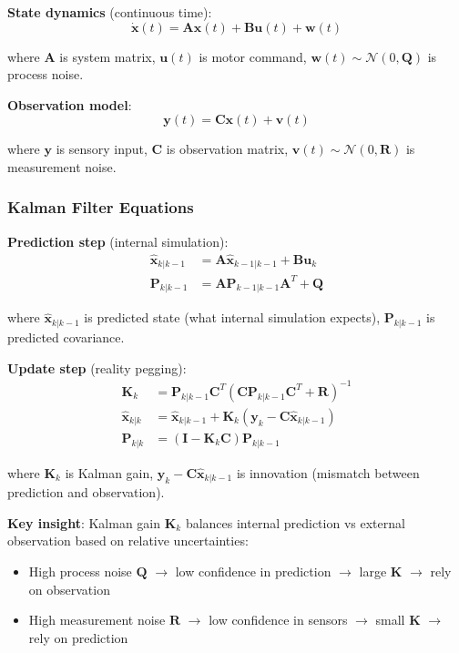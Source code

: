 \documentclass[11pt,onecolumn]{article}
\begin{document}
\textbf{State dynamics} (continuous time):
\begin{equation}
\dot{\mathbf{x}}(t) = \mathbf{A}\mathbf{x}(t) + \mathbf{B}\mathbf{u}(t) + \mathbf{w}(t)
\end{equation}

where $\mathbf{A}$ is system matrix, $\mathbf{u}(t)$ is motor command, $\mathbf{w}(t) \sim \mathcal{N}(0, \mathbf{Q})$ is process noise.

\textbf{Observation model}:
\begin{equation}
\mathbf{y}(t) = \mathbf{C}\mathbf{x}(t) + \mathbf{v}(t)
\end{equation}

where $\mathbf{y}$ is sensory input, $\mathbf{C}$ is observation matrix, $\mathbf{v}(t) \sim \mathcal{N}(0, \mathbf{R})$ is measurement noise.

\subsubsection{Kalman Filter Equations}

\textbf{Prediction step} (internal simulation):
\begin{align}
\hat{\mathbf{x}}_{k|k-1} &= \mathbf{A}\hat{\mathbf{x}}_{k-1|k-1} + \mathbf{B}\mathbf{u}_k \\
\mathbf{P}_{k|k-1} &= \mathbf{A}\mathbf{P}_{k-1|k-1}\mathbf{A}^T + \mathbf{Q}
\end{align}

where $\hat{\mathbf{x}}_{k|k-1}$ is predicted state (what internal simulation expects), $\mathbf{P}_{k|k-1}$ is predicted covariance.

\textbf{Update step} (reality pegging):
\begin{align}
\mathbf{K}_k &= \mathbf{P}_{k|k-1}\mathbf{C}^T(\mathbf{C}\mathbf{P}_{k|k-1}\mathbf{C}^T + \mathbf{R})^{-1} \\
\hat{\mathbf{x}}_{k|k} &= \hat{\mathbf{x}}_{k|k-1} + \mathbf{K}_k(\mathbf{y}_k - \mathbf{C}\hat{\mathbf{x}}_{k|k-1}) \\
\mathbf{P}_{k|k} &= (\mathbf{I} - \mathbf{K}_k\mathbf{C})\mathbf{P}_{k|k-1}
\end{align}

where $\mathbf{K}_k$ is Kalman gain, $\mathbf{y}_k - \mathbf{C}\hat{\mathbf{x}}_{k|k-1}$ is innovation (mismatch between prediction and observation).

\textbf{Key insight}: Kalman gain $\mathbf{K}_k$ balances internal prediction vs external observation based on relative uncertainties:
\begin{itemize}
\item High process noise $\mathbf{Q}$ $\to$ low confidence in prediction $\to$ large $\mathbf{K}$ $\to$ rely on observation
\item High measurement noise $\mathbf{R}$ $\to$ low confidence in sensors $\to$ small $\mathbf{K}$ $\to$ rely on prediction
\end{itemize}
\end{document}
